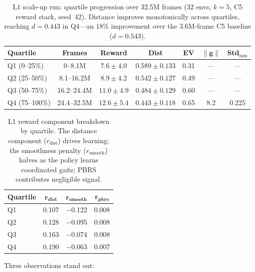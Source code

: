 \documentclass[11pt]{article}
\begin{document}
\begin{table}[H]
  \centering
  \small
  \renewcommand{\arraystretch}{1.3}
  \caption{L1 scale-up run: quartile progression over 32.5M frames (32 envs, $k{=}5$, C5 reward stack, seed~42). Distance improves monotonically across quartiles, reaching $d{=}0.443$ in Q4---an 18\% improvement over the 3.6M-frame C5 baseline ($d{=}0.543$).}
  \label{tab:scaleup-l1}
  \begin{tabular}{@{}lcccccc@{}}
    \toprule
    \textbf{Quartile} & \textbf{Frames} & \textbf{Reward} & \textbf{Dist} & \textbf{EV} & $\|\boldsymbol{g}\|$ & \textbf{Std$_{\min}$} \\
    \midrule
    Q1 (0--25\%)  & 0--8.1M   & $7.6 \pm 4.0$  & $0.589 \pm 0.133$ & 0.31 & --- & --- \\
    Q2 (25--50\%) & 8.1--16.2M & $8.9 \pm 4.2$  & $0.542 \pm 0.127$ & 0.49 & --- & --- \\
    Q3 (50--75\%) & 16.2--24.4M & $11.0 \pm 4.9$ & $0.484 \pm 0.129$ & 0.60 & --- & --- \\
    Q4 (75--100\%) & 24.4--32.5M & $12.6 \pm 5.4$ & $\mathbf{0.443 \pm 0.118}$ & 0.65 & 8.2 & 0.225 \\
    \bottomrule
  \end{tabular}
\end{table}

\begin{table}[H]
  \centering
  \small
  \renewcommand{\arraystretch}{1.3}
  \caption{L1 reward component breakdown by quartile. The distance component ($r_{\text{dist}}$) drives learning; the smoothness penalty ($r_{\text{smooth}}$) halves as the policy learns coordinated gaits; PBRS contributes negligible signal.}
  \label{tab:scaleup-l1-components}
  \begin{tabular}{@{}lccc@{}}
    \toprule
    \textbf{Quartile} & $\boldsymbol{r_{\textbf{dist}}}$ & $\boldsymbol{r_{\textbf{smooth}}}$ & $\boldsymbol{r_{\textbf{pbrs}}}$ \\
    \midrule
    Q1 & 0.107 & $-$0.122 & 0.008 \\
    Q2 & 0.128 & $-$0.095 & 0.008 \\
    Q3 & 0.163 & $-$0.074 & 0.008 \\
    Q4 & 0.190 & $-$0.063 & 0.007 \\
    \bottomrule
  \end{tabular}
\end{table}

\noindent
Three observations stand out:
\end{document}
